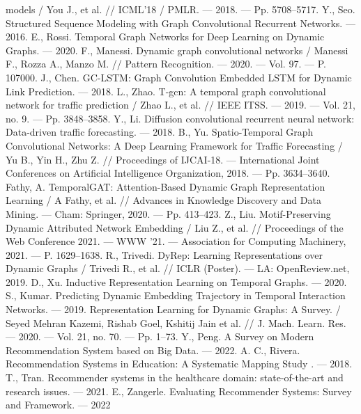 \documentclass[a4paper,14pt,oneside]{mipt-thesis-ms}
\begin{document}
\begin{thebibliography}{99}
models / You J., et al. // ICML’18 / PMLR. — 2018. — Pp. 5708–5717.
        Y., Seo. Structured Sequence Modeling with Graph Convolutional Recurrent Networks. — 2016.
        E., Rossi. Temporal Graph Networks for Deep Learning on Dynamic
Graphs. — 2020.
        F., Manessi. Dynamic graph convolutional networks / Manessi F., Rozza A., Manzo M. // Pattern Recognition. — 2020. — Vol. 97. — P. 107000.
        J., Chen. GC-LSTM: Graph Convolution Embedded LSTM for Dynamic
Link Prediction. — 2018.
        L., Zhao. T-gcn: A temporal graph convolutional network for traffic prediction / Zhao L., et al. // IEEE ITSS. — 2019. — Vol. 21, no. 9. —
Pp. 3848–3858.
        Y., Li. Diffusion convolutional recurrent neural network: Data-driven traffic forecasting. — 2018.
        B., Yu. Spatio-Temporal Graph Convolutional Networks: A Deep Learning
Framework for Traffic Forecasting / Yu B., Yin H., Zhu Z. // Proceedings
of IJCAI-18. — International Joint Conferences on Artificial Intelligence
Organization, 2018. — Pp. 3634–3640.
        Fathy, A. TemporalGAT: Attention-Based Dynamic Graph Representation
Learning / A Fathy, et al. // Advances in Knowledge Discovery and Data
Mining. — Cham: Springer, 2020. — Pp. 413–423.
        Z., Liu. Motif-Preserving Dynamic Attributed Network Embedding /
Liu Z., et al. // Proceedings of the Web Conference 2021. — WWW
’21. — Association for Computing Machinery, 2021. — P. 1629–1638.
        R., Trivedi. DyRep: Learning Representations over Dynamic Graphs /
Trivedi R., et al. // ICLR (Poster). — LA: OpenReview.net, 2019.
        D., Xu. Inductive Representation Learning on Temporal Graphs. — 2020.
        S., Kumar. Predicting Dynamic Embedding Trajectory in Temporal Interaction Networks. — 2019.
        Representation Learning for Dynamic Graphs: A Survey. /
Seyed Mehran Kazemi, Rishab Goel, Kshitij Jain et al. // J. Mach.
Learn. Res. — 2020. — Vol. 21, no. 70. — Pp. 1–73.
        Y., Peng. A Survey on Modern Recommendation System based on Big Data. — 2022.   
        A. C., Rivera. Recommendation Systems in Education: A Systematic Mapping Study . — 2018.
        T., Tran. Recommender systems in the healthcare domain: state-of-the-art and research issues. — 2021.
        E., Zangerle. Evaluating Recommender Systems: Survey and Framework. — 2022

\end{thebibliography}
\end{document}
